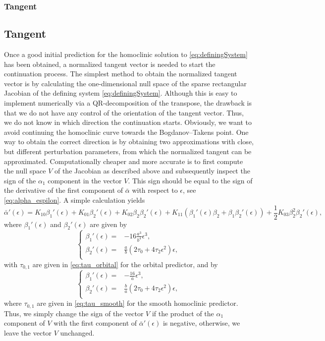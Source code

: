 \ifthesis
\subsubsection{Tangent}
\else
\subsection{Tangent}
\fi
Once a good initial prediction for the homoclinic solution to
\cref{eq:definingSystem} has been obtained, a normalized tangent vector is
needed to start the continuation process. The simplest method to obtain the
normalized tangent vector is by calculating the one-dimensional null space of
the sparse rectangular Jacobian of the defining system \cref{eq:definingSystem}.
Although this is easy to implement numerically via a QR-decomposition of the
transpose, the drawback is that we do not have any control of the orientation
of the tangent vector. Thus, we do not know in which direction the continuation
starts.  Obviously, we want to avoid continuing the homoclinic curve towards
the Bogdanov--Takens point. One way to obtain the correct direction is by
obtaining two approximations with close, but different perturbation parameters,
from which the normalized tangent can be approximated.  Computationally cheaper
and more accurate is to first compute the null space $V$ of the Jacobian as
described above and subsequently inspect the sign of the $\alpha_1$ component
in the vector $V$. This sign should be equal to the sign of the derivative of
the first component of $\bar\alpha$ with respect to $\epsilon$, see
\cref{eq:alpha_espilon}. A simple calculation yields
\[
\bar\alpha'(\epsilon)  = K_{10} \beta_1'(\epsilon) + K_{01} \beta_2'(\epsilon) +
     K_{02} \beta_2 \beta_2'(\epsilon) + K_{11} (\beta_1'(\epsilon) \beta_2 +
     \beta_1 \beta_2'(\epsilon)) + \frac{1}{2} K_{03}\beta_2^2 \beta_2'(\epsilon),
\] 
where $\beta_1'(\epsilon)$ and $\beta_2'(\epsilon)$ are given by
\[
\left\{
\begin{aligned}
    \beta_1'(\epsilon) ={}& -16 \frac{a^3}{b^4} \epsilon^3, \\
    \beta_2'(\epsilon) ={}& \frac{a}{b} (2 \tau_0 + 4 \tau_2 \epsilon^2) \epsilon, \\
\end{aligned}
\right.
\] 
with $\tau_{0,1}$ are given in \cref{eq:tau_orbital} for the orbital
predictor, and by
\[
\left\{
\begin{aligned}
    \beta_1'(\epsilon) ={}&  -\frac{16}{a} \epsilon^3, \\
    \beta_2'(\epsilon) ={}& \frac{b}{a} (2 \tau_0 + 4 \tau_2 \epsilon^2) \epsilon, \\
\end{aligned}
\right.
\] 
where $\tau_{0,1}$ are given in \cref{eq:tau_smooth} for the smooth homoclinic
predictor. Thus, we simply change the sign of the vector $V$ if the product of
the $\alpha_1$ component of $V$ with the first component of $\bar\alpha'(\epsilon)$
is negative, otherwise, we leave the vector $V$ unchanged.


